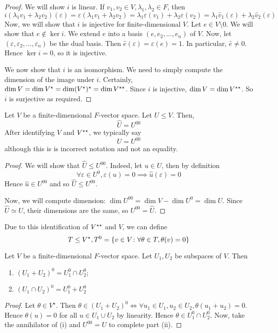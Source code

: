 \begin{proof}
	We will show \( i \) is linear.
	If \( v_1, v_2 \in V, \lambda_1, \lambda_2 \in F \), then
	\[
		i(\lambda_1 v_1 + \lambda_2 v_2) (\varepsilon) = \varepsilon(\lambda_1 v_1 + \lambda_2 v_2) = \lambda_1 \varepsilon(v_1) + \lambda_2 \varepsilon(v_2) = \lambda_1 \hat v_1(\varepsilon) + \lambda_2 \hat v_2(\varepsilon)
	\]
	Now, we will show that \( i \) is injective for finite-dimensional \( V \).
	Let \( e \in V \setminus \qty{0} \).
	We will show that \( e \not\in \ker i \).
	We extend \( e \) into a basis \( (e, e_2, \dots, e_n) \) of \( V \).
	Now, let \( (\varepsilon, \varepsilon_2, \dots, \varepsilon_n) \) be the dual basis.
	Then \( \hat e(\varepsilon) = \varepsilon(e) = 1 \).
	In particular, \( \hat e \neq 0 \).
	Hence \( \ker i = \qty{0} \), so it is injective.

	We now show that \( i \) is an isomorphism.
	We need to simply compute the dimension of the image under \( i \).
	Certainly, \( \dim V = \dim V^\star = \dim (V^\star)^\star = \dim V^{\star\star} \).
	Since \( i \) is injective, \( \dim V = \dim V^{\star\star} \).
	So \( i \) is surjective as required.
\end{proof}
\begin{lemma}
	Let \( V \) be a finite-dimensional \( F \)-vector space.
	Let \( U \leq V \).
	Then,
	\[
		\hat U = U^{00}
	\]
	After identifying \( V \) and \( V^{\star\star} \), we typically say
	\[
		U = U^{00}
	\]
	although this is is incorrect notation and not an equality.
\end{lemma}
\begin{proof}
	We will show that \( \hat U \leq U^{00} \).
	Indeed, let \( u \in U \), then by definition
	\[
		\forall \varepsilon \in U^0, \varepsilon(u) = 0 \implies \hat u(\varepsilon) = 0
	\]
	Hence \( \hat u \in U^{00} \) and so \( \hat U \leq U^{00} \).

	Now, we will compute dimension:	\( \dim U^{00} = \dim V - \dim U^0 = \dim U \).
	Since \( \hat U \simeq U \), their dimensions are the same, so \( U^{00} = \hat U \).
\end{proof}
\begin{remark}
	Due to this identification of \( V^{\star\star} \) and \( V \), we can define
	\[
		T \leq V^\star, T^0 = \qty{v \in V \colon \forall \theta \in T, \theta(v) = 0}
	\]
\end{remark}
\begin{lemma}
	Let \( V \) be a finite-dimensional \( F \)-vector space.
	Let \( U_1, U_2 \) be subspaces of \( V \).
	Then
	\begin{enumerate}
		\item \( (U_1 + U_2)^0 = U_1^0 \cap U_2^0 \);
		\item \( (U_1 \cap U_2)^0 = U_1^0 + U_2^0 \)
	\end{enumerate}
\end{lemma}
\begin{proof}
	Let \( \theta \in V^\star \).
	Then \( \theta \in (U_1 + U_2)^0 \iff \forall u_1 \in U_1, u_2 \in U_2, \theta(u_1 + u_2) = 0 \).
	Hence \( \theta(u) = 0 \) for all \( u \in U_1 \cup U_2 \) by linearity.
	Hence \( \theta \in U_1^0 \cap U_2^0 \).
	Now, take the annihilator of (i) and \( U^{00} = U \) to complete part (ii).
\end{proof}
